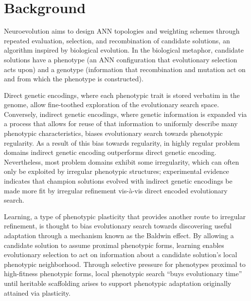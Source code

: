\section{Background}

Neuroevolution aims to design ANN topologies and weighting schemes through repeated evaluation, selection, and recombination of candidate solutions, an algorithm inspired by biological evolution. In the biological metaphor, candidate solutions have a phenotype (an ANN configuration that evolutionary selection acts upon) and a genotype (information that recombination and mutation act on and from which the phenotype is constructed). 

Direct genetic encodings, where each phenotypic trait is stored verbatim in the genome, allow fine-toothed exploration of the evolutionary search space. Conversely, indirect genetic encodings, where genetic information is expanded via a process that allows for reuse of that information to uniformly describe many phenotypic characteristics, biases evolutionary search towards phenotypic regularity.\autocite{Clune2011OnRegularity} As a result of this bias towards regularity, in highly regular problem domains indirect genetic encoding outperforms direct genetic encoding.\autocite{Clune2011OnRegularity} Nevertheless, most problem domains exhibit some irregularity, which can often only be exploited by irregular phenotypic structures; experimental evidence indicates that champion solutions evolved with indirect genetic encodings be made more fit by irregular refinement vis-\`a-vis direct encoded evolutionary search.\autocite{Clune2011OnRegularity} 

Learning, a type of phenotypic plasticity that provides another route to irregular refinement,\autocite{Clune2011OnRegularity} is thought to bias evolutionary search towards discovering useful adaptation through a mechanism known as the Baldwin effect.\autocite{Downing2010TheNetworks} By allowing a candidate solution to assume proximal phenotypic forms, learning enables evolutionary selection to act on information about a candidate solution's local phenotypic neighborhood. Through selective pressure for phenotypes proximal to high-fitness phenotypic forms, local phenotypic search ``buys evolutionary time'' until heritable scaffolding arises to support phenotypic adaptation originally attained via plasticity.\autocite{Downing2010TheNetworks}